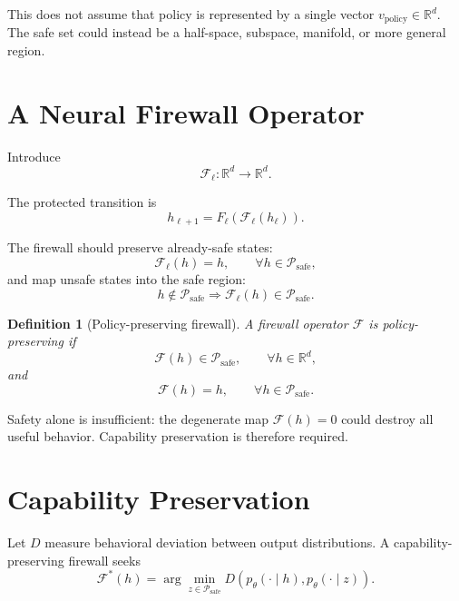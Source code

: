 \documentclass[11pt]{article}
\newcommand{\R}{\mathbb{R}}
\newcommand{\Psafe}{\mathcal{P}_{\mathrm{safe}}}
\newtheorem{definition}{Definition}
\begin{document}
This does not assume that policy is represented by a single vector
$v_{\mathrm{policy}}\in\R^d$. The safe set could instead be a half-space,
subspace, manifold, or more general region.

\section{A Neural Firewall Operator}

Introduce
\begin{equation}
\mathcal{F}_\ell:\R^d\rightarrow\R^d.
\end{equation}

The protected transition is
\begin{equation}
h_{\ell+1}=F_\ell\!\left(\mathcal{F}_\ell(h_\ell)\right).
\end{equation}

The firewall should preserve already-safe states:
\begin{equation}
\mathcal{F}_\ell(h)=h,\qquad \forall h\in\Psafe,
\end{equation}
and map unsafe states into the safe region:
\begin{equation}
h\notin\Psafe\Longrightarrow
\mathcal{F}_\ell(h)\in\Psafe.
\end{equation}

\begin{definition}[Policy-preserving firewall]
A firewall operator $\mathcal F$ is policy-preserving if
\begin{equation}
\mathcal F(h)\in\Psafe,\qquad\forall h\in\R^d,
\end{equation}
and
\begin{equation}
\mathcal F(h)=h,\qquad\forall h\in\Psafe.
\end{equation}
\end{definition}

Safety alone is insufficient: the degenerate map $\mathcal F(h)=0$ could
destroy all useful behavior. Capability preservation is therefore required.

\section{Capability Preservation}

Let $D$ measure behavioral deviation between output distributions. A
capability-preserving firewall seeks
\begin{equation}
\mathcal F^*(h)
=
\arg\min_{z\in\Psafe}
D\!\left(p_\theta(\cdot\mid h),p_\theta(\cdot\mid z)\right).
\end{equation}
\end{document}
